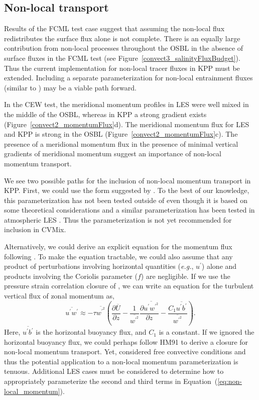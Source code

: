 \documentclass[preprint,12pt,authoryear]{agujournal}
\begin{document}
\subsection{Non-local transport}
\label{sec:futureNLT}

Results of the FCML test case suggest that assuming the non-local flux redistributes the surface flux alone is not complete.  There is an equally large contribution from non-local processes throughout the OSBL in the absence of surface fluxes in the FCML test (see Figure~\ref{convect3_salinityFluxBudget}).  Thus the current implementation for non-local tracer fluxes in KPP must be extended. Including a separate parameterization for non-local entrainment fluxes (similar to \citealp{Noh2003}) may be a viable path forward.

In the CEW test, the meridional momentum profiles in LES were well mixed in the middle of the OSBL, whereas in KPP a strong gradient exists (Figure~\ref{convect2_momentumFlux}d).  The meridional momentum flux for LES and KPP is strong in the OSBL (Figure~\ref{convect2_momentumFlux}c).  The presence of a meridional momentum flux in the presence of minimal vertical gradients of meridional momentum suggest an importance of non-local momentum transport.  

We see two possible paths for the inclusion of non-local momentum transport in KPP. First, we could use the form suggested by \cite{Smyth2002}.  To the best of our knowledge, this parameterization has not been tested outside of \cite{Smyth2002} even though it is based on some theoretical considerations and a similar parameterization has been tested in atmospheric LES \citep{frech1995two,brown1997non}.  Thus the \cite{Smyth2002} parameterization is not yet recommended for inclusion in CVMix.

Alternatively, we could derive an explicit equation for the momentum flux following \cite{DONALDSON1972}.  To make the equation tractable, we could also assume that any product of perturbations involving horizontal quantities (\textit{e.g.}, $u^\prime$) alone and products involving the Coriolis parameter ($f$) are negligible.  If we use the pressure strain correlation closure of \cite{canuto2007non}, we can write an equation for the turbulent vertical flux of zonal momentum as, 
\begin{equation}
\label{eq:non-local_momentum}
\overline{u^\prime w^\prime} \approx -\tau \overline{w^{\prime^2}} \left(\frac{\partial \overline{U}}{\partial z} -\frac{1}{\overline{w^{\prime^2}}} \frac{\partial \overline{u^{\prime} w^{\prime^2}}}{\partial z} - \frac{C_1 \overline{u^\prime b^\prime}}{\overline{w^{\prime^2}}} \right).
\end{equation}
Here, $\overline{u^\prime b^\prime}$ is the horizontal buoyancy flux, and $C_1$ is a constant.  If we ignored the horizontal buoyancy flux, we could perhaps follow HM91 to derive a closure for non-local momentum transport.  Yet, \cite{Holtslag1991} considered free convective conditions and thus the potential application to a non-local momentum parameterization is tenuous.  Additional LES cases must be considered to determine how to appropriately parameterize the second and third terms in Equation~(\ref{eq:non-local_momentum}).
\end{document}
